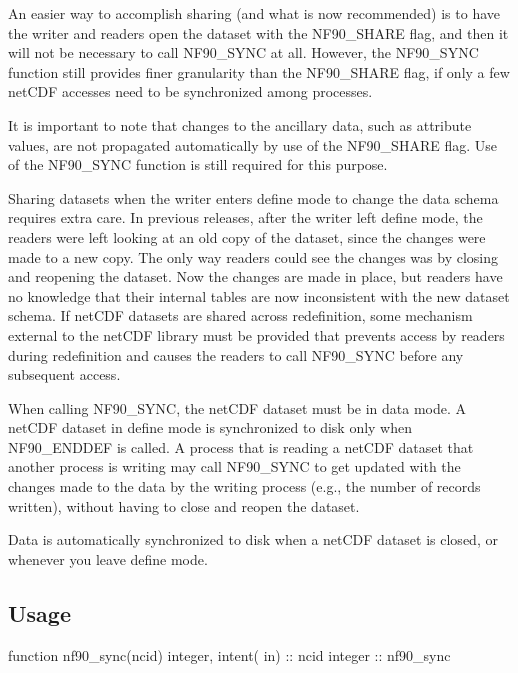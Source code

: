 An easier way to accomplish sharing (and what is now recommended) is to have the writer and readers open the dataset with the N\+F90\+\_\+\+S\+H\+A\+RE flag, and then it will not be necessary to call N\+F90\+\_\+\+S\+Y\+NC at all. However, the N\+F90\+\_\+\+S\+Y\+NC function still provides finer granularity than the N\+F90\+\_\+\+S\+H\+A\+RE flag, if only a few net\+C\+DF accesses need to be synchronized among processes.

It is important to note that changes to the ancillary data, such as attribute values, are not propagated automatically by use of the N\+F90\+\_\+\+S\+H\+A\+RE flag. Use of the N\+F90\+\_\+\+S\+Y\+NC function is still required for this purpose.

Sharing datasets when the writer enters define mode to change the data schema requires extra care. In previous releases, after the writer left define mode, the readers were left looking at an old copy of the dataset, since the changes were made to a new copy. The only way readers could see the changes was by closing and reopening the dataset. Now the changes are made in place, but readers have no knowledge that their internal tables are now inconsistent with the new dataset schema. If net\+C\+DF datasets are shared across redefinition, some mechanism external to the net\+C\+DF library must be provided that prevents access by readers during redefinition and causes the readers to call N\+F90\+\_\+\+S\+Y\+NC before any subsequent access.

When calling N\+F90\+\_\+\+S\+Y\+NC, the net\+C\+DF dataset must be in data mode. A net\+C\+DF dataset in define mode is synchronized to disk only when N\+F90\+\_\+\+E\+N\+D\+D\+EF is called. A process that is reading a net\+C\+DF dataset that another process is writing may call N\+F90\+\_\+\+S\+Y\+NC to get updated with the changes made to the data by the writing process (e.\+g., the number of records written), without having to close and reopen the dataset.

Data is automatically synchronized to disk when a net\+C\+DF dataset is closed, or whenever you leave define mode.

\subsection*{Usage}


\begin{DoxyCode}
\textcolor{keyword}{function }nf90\_sync(ncid)
  \textcolor{keywordtype}{integer}, \textcolor{keywordtype}{intent( in)} :: ncid
  \textcolor{keywordtype}{integer}              :: nf90\_sync
\end{DoxyCode}


